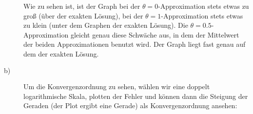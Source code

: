 \documentclass[11pt,a4paper,ngerman]{article}
\begin{document}
\begin{description}
Wie zu sehen ist, ist der Graph bei der $\theta = 0$-Approximation stets etwas zu groß (über der exakten Lösung), bei der $\theta = 1$-Approximation stets etwas zu klein (unter dem Graphen der exakten Lösung). Die $\theta = 0.5$-Approximation gleicht genau diese Schwäche aus, in dem der Mittelwert der beiden Approximationen benutzt wird. Der Graph liegt fast genau auf dem der exakten Lösung.

\item[b)] Um die Konvergenzordnung zu sehen, wählen wir eine doppelt logarithmische Skala, plotten der Fehler und können dann die Steigung der Geraden (der Plot ergibt eine Gerade) als Konvergenzordnung ansehen: \\

\begin{figure}[ht!]
\center
{}
\end{figure}
\end{description}
\end{document}
